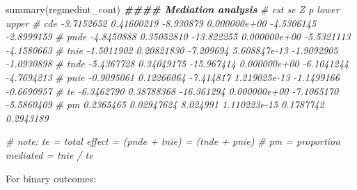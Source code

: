 \documentclass[
]{book}
\newenvironment{Shaded}{\begin{snugshade}}{\end{snugshade}}
\newcommand{\CommentTok}[1]{\textcolor[rgb]{0.56,0.35,0.01}{\textit{#1}}}
\newcommand{\DocumentationTok}[1]{\textcolor[rgb]{0.56,0.35,0.01}{\textbf{\textit{#1}}}}
\newcommand{\FunctionTok}[1]{\textcolor[rgb]{0.00,0.00,0.00}{#1}}
\newcommand{\NormalTok}[1]{#1}
\begin{document}
\begin{Shaded}
\begin{Highlighting}[]
\FunctionTok{summary}\NormalTok{(regmedint\_cont)}
\DocumentationTok{\#\#\#\# Mediation analysis}
\CommentTok{\#             est         se          Z            p      lower      upper}
\CommentTok{\# cde  {-}3.7152652 0.41600219  {-}8.930879 0.000000e+00 {-}4.5306145 {-}2.8999159}
\CommentTok{\# pnde {-}4.8450888 0.35052810 {-}13.822255 0.000000e+00 {-}5.5321113 {-}4.1580663}
\CommentTok{\# tnie {-}1.5011902 0.20821830  {-}7.209694 5.608847e{-}13 {-}1.9092905 {-}1.0930898}
\CommentTok{\# tnde {-}5.4367728 0.34049175 {-}15.967414 0.000000e+00 {-}6.1041244 {-}4.7694213}
\CommentTok{\# pnie {-}0.9095061 0.12266064  {-}7.414817 1.219025e{-}13 {-}1.1499166 {-}0.6690957}
\CommentTok{\# te   {-}6.3462790 0.38788368 {-}16.361294 0.000000e+00 {-}7.1065170 {-}5.5860409}
\CommentTok{\# pm    0.2365465 0.02947624   8.024991 1.110223e{-}15  0.1787742  0.2943189}

\CommentTok{\# note: te = total effect = (pnde + tnie) = (tnde + pnie)}
\CommentTok{\#       pm = proportion mediated = tnie / te}
\end{Highlighting}
\end{Shaded}

For binary outcomes:
\end{document}
